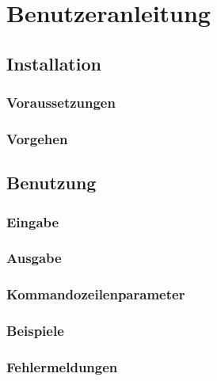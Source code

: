 \section{Benutzeranleitung}
\label{sec:benutzeranleitung}

\subsection{Installation}
\label{ssec:installation}

\subsubsection{Voraussetzungen}
\label{sssec:voraussetzungen}

\subsubsection{Vorgehen}
\label{sssec:vorgehen}

\subsection{Benutzung}
\label{ssec:benutzung}

\subsubsection{Eingabe}
\label{sssec:eingaben}

\subsubsection{Ausgabe}
\label{sssec:ausgaben}

\subsubsection{Kommandozeilenparameter}
\label{sssec:kommandozeilenparameter}

\subsubsection{Beispiele}
\label{sssec:beispiele}

\subsubsection{Fehlermeldungen}
\label{sssec:fehlermeldungen}